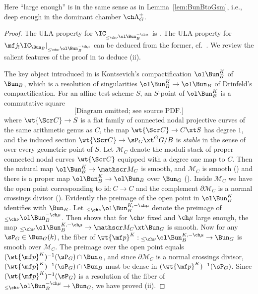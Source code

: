 Here ``large enough'' is in the same sense as in Lemma~\ref{lem:BunBtoGsm}, i.e.,
deep enough in the dominant chamber $\ch\Lambda^+_G$.

\begin{proof}
The ULA property for $\IC_{_{\le \ch\nu}\ol\Bun^{-\ch\mu}_B}$
is \cite[Corollary 4.1.1.1]{Campbell}.
The ULA property for $\mf j_! \IC_{\Bun_B}|_{_{\le \ch\nu}\ol\Bun^{-\ch\mu}_B}$ can be deduced from the former, cf.~\cite[\S 4.3]{Campbell2}.
We review the salient features of the proof in \cite{Campbell} to deduce (ii).

The key object introduced in \cite{Campbell} is Kontsevich's compactification
$\ol\Bun_B^K$ of $\Bun_B$, which is a resolution of singularities $\ol\Bun_B^K \to \ol\Bun_B$
of Drinfeld's compactification. For an affine test scheme $S$,
an $S$-point of $\ol\Bun_B^K$ is a commutative square
\[
\text{[Diagram omitted; see source PDF.]}
\]
where $\wt{\Scr C} \to S$ is a flat family of connected nodal projective curves of the
same arithmetic genus as $C$, the map $\wt{\Scr C} \to C\xt S$ has degree $1$,
and the induced section $\wt{\Scr C} \to \sP_G \xt^G G/B$ is \emph{stable}
in the sense of \cite{Kontsevich} over every geometric point of $S$.
Let $\mathscr M_C$ denote the moduli stack of proper connected nodal curves $\wt{\Scr C}$
equipped with a degree one map to $C$.
Then the natural map $\ol\Bun_B^K\to \mathscr M_C$ is smooth, and $\mathscr M_C$ is
smooth (\cite[Proposition 2.4.1]{Campbell}) and there is a proper map
$\ol\Bun_B^K \to \ol\Bun_B$ over $\Bun_G$ (\cite[Proposition 3.2.2]{Campbell}).
Inside $\mathscr M_C$ we have the open point corresponding to $\mathrm{id} : C\to C$
and the complement $\partial\mathscr M_C$ is a normal crossings divisor (\cite[Proposition 4.4.1]{Campbell}). Evidently the preimage of the open point in $\ol\Bun_B^K$ identifies
with $\Bun_B$.
Let $_{\le\ch\nu}\ol\Bun_B^{K,-\ch\mu}$ denote the preimage of $_{\le\ch\nu}\ol\Bun_B^{-\ch\mu}$. Then \cite[Proposition 4.1.1]{Campbell} shows that
for $\ch\nu$ fixed and $\ch\mu$ large enough, the map
$_{\le\ch\nu}\ol\Bun_B^{K,-\ch\mu} \to \mathscr M_C \xt \Bun_G$ is smooth.
Now for any $\sP_G \in \Bun_G(k)$, the fiber of $\wt{\mf p}^K: {_{\le\ch\nu}}\ol\Bun_B^{K,-\ch\mu} \to \Bun_G$ is smooth over $\mathscr M_C$.
The preimage over the open point equals $(\wt{\mf p}^K)^{-1}(\sP_G) \cap \Bun_B$,
and since $\partial \mathscr M_C$ is a normal crossings divisor,
$(\wt{\mf p}^K)^{-1}(\sP_G) \cap \Bun_B$ must be dense in $(\wt{\mf p}^K)^{-1}(\sP_G)$.
Since $(\wt{\mf p}^K)^{-1}(\sP_G)$ is a resolution of
the fiber of $_{\le\ch\nu}\ol\Bun_B^{-\ch\mu}\to\Bun_G$, we have proved (ii).
\end{proof}

